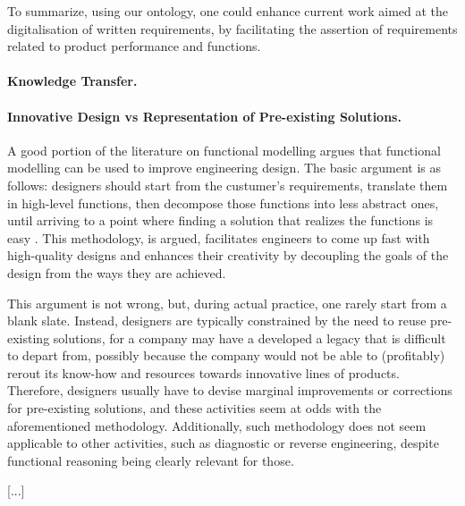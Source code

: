 \documentclass[sw]{iosart2x}
\newcommand{\TODO}[1]{{\color{red} #1
}}
\begin{document}
To summarize, using our ontology, one could enhance current work aimed at the digitalisation of written requirements, by facilitating the assertion of requirements related to product performance and functions.

\paragraph{Knowledge Transfer.}

\paragraph{Innovative Design vs Representation of Pre-existing Solutions.}
A good portion of the literature on functional modelling argues that functional modelling can be used to improve engineering design.
The basic argument is as follows: designers should start from the custumer's requirements, translate them in high-level functions, then decompose those functions into less abstract ones, until arriving to a point where finding a solution that realizes the functions is easy \TODO{\cite{..}}.
This methodology, is argued, facilitates engineers to come up fast with high-quality designs and enhances their creativity by decoupling the goals of the design from the ways they are achieved.

This argument is not wrong, but, during actual practice, one rarely start from a blank slate. 
Instead, designers are typically constrained by the need to reuse pre-existing solutions, for a company may have a developed a legacy that is difficult to depart from, possibly because the company would not be able to (profitably) rerout its know-how and resources towards innovative lines of products.
Therefore, designers usually have to devise marginal improvements or corrections for pre-existing solutions, and these activities seem at odds with the aforementioned methodology. %
Additionally, such methodology does not seem applicable to other activities, such as diagnostic or reverse engineering, despite functional reasoning being clearly relevant for those. \cite{}

[...]

 
\end{document}

